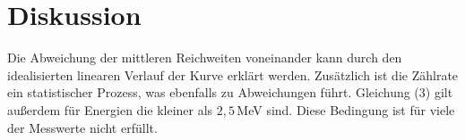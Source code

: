 \section{Diskussion}
\label{sec:Diskussion}

Die Abweichung der mittleren Reichweiten voneinander kann durch den idealisierten linearen Verlauf der Kurve erklärt werden. Zusätzlich ist
die Zählrate ein statistischer Prozess, was ebenfalls zu Abweichungen führt. Gleichung (3) gilt außerdem für Energien die kleiner als
$2,5\,$MeV sind. Diese Bedingung ist für viele der Messwerte nicht erfüllt.
